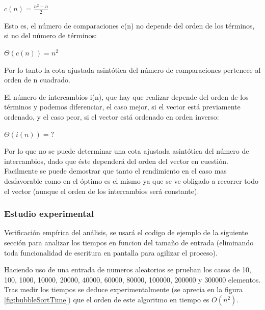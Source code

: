 \documentclass[8pt, A4]{article}    %
\begin{document}
\begin{center}
${\displaystyle c(n)={\frac {n^{2}-n}{2}}}$
\end{center}

Esto es, el número de comparaciones c(n) no depende del orden de los términos, si no del número de términos:

\begin{center}
${\displaystyle \Theta (c(n))=n^{2}\;}$
\end{center}

Por lo tanto la cota ajustada asintótica del número de comparaciones pertenece al orden de n cuadrado.

El número de intercambios i(n), que hay que realizar depende del orden de los términos y podemos diferenciar, el caso mejor, si el vector está previamente ordenado, y el caso peor, si el vector está ordenado en orden inverso:

\begin{center}
${\displaystyle \Theta (i(n))= ?\;}$
\end{center}

Por lo que no se puede determinar una cota ajustada asintótica del número de intercambios, dado que éste dependerá del orden del vector en cuestión.\\

Facilmente se puede demostrar que tanto el rendimiento en el caso mas desfavorable como en el óptimo es el mismo ya que se ve obligado a recorrer todo el vector (aunque el orden de los intercambios será constante).

\subsubsection{Estudio experimental}
Verificación empírica del análisis, se usará el codigo de ejemplo de la siguiente sección para analizar los tiempos en funcion del tamaño de entrada (eliminando toda funcionalidad de escritura en pantalla para agilizar el proceso).

Haciendo uso de una entrada de numeros aleatorios se prueban los casos de 10, 100, 1000, 10000, 20000, 40000, 60000, 80000, 100000, 200000 y 300000 elementos.
Tras medir los tiempos se deduce experimentalmente (se aprecia en la figura \ref{fig:bubbleSortTime}) que el orden de este algoritmo en tiempo es $O(n^2)$.
\end{document}
